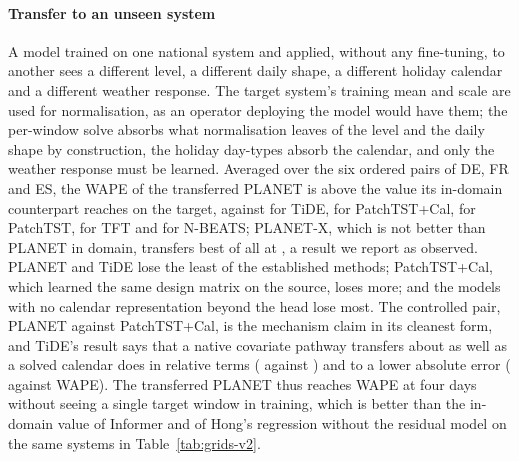 \paragraph{Transfer to an unseen system} A model trained on one national system and applied,
without any fine-tuning, to another sees a different level, a different daily shape, a
different holiday calendar and a different weather response. The target system's training
mean and scale are used for normalisation, as an operator deploying the model would have
them; the per-window solve absorbs what normalisation leaves of the level and the daily shape
by construction, the holiday day-types absorb the calendar, and only the weather response must
be learned. Averaged over the six ordered pairs of DE, FR and ES, the WAPE of the transferred
PLANET is  above the value its in-domain counterpart
reaches on the target, against  for TiDE,
 for PatchTST+Cal,
 for PatchTST,
 for TFT and 
for N-BEATS; PLANET-X, which is not better than PLANET in domain, transfers best of all at
, a result we report as observed. PLANET and TiDE
lose the least of the established methods; PatchTST+Cal, which learned the same design matrix
on the source, loses more; and the models with no calendar representation beyond the head lose
most. The controlled pair, PLANET against PatchTST+Cal, is the mechanism claim in its cleanest
form, and TiDE's result says that a native covariate pathway transfers about as well as a solved
calendar does in relative terms ( against
) and to a lower absolute error
( against  WAPE). The
transferred PLANET thus reaches  WAPE at four days without seeing a single target window in
training, which is better than the in-domain value of Informer and of Hong's regression
without the residual model on the same systems in Table~\ref{tab:grids-v2}.

